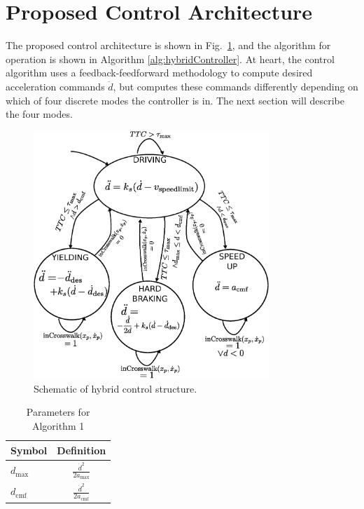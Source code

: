 \documentclass[letterpaper, 10 pt, conference]{ieeeconf}  %
\begin{document}
\section{Proposed Control Architecture}

The proposed control architecture is shown in Fig.~\ref{fig:hybridController}, and the algorithm for operation is shown in Algorithm \ref{alg:hybridController}. At heart, the control algorithm uses a feedback-feedforward methodology to compute desired acceleration commands $\ddot{d}$, but computes these commands differently depending on which of four discrete modes the controller is in. The next section will describe the four modes. 

\begin{figure}
\centering
\includegraphics[width=3.5in]{figures/stateDiagram2.eps}
\caption{Schematic of hybrid control structure.}
\label{fig:hybridController}
\end{figure}

\begin{table}[h]
\begin{center}
\caption{Parameters for Algorithm 1}\label{tb:params}
\begin{tabular}{lc}
Symbol & Definition \\\hline\hline
$d_\mathrm{max}$ & $\frac{\dot{d}^2}{2a_\mathrm{max}}$ \\
$d_\mathrm{cmf}$ & $\frac{\dot{d}^2}{2a_\mathrm{cmf}}$ \\\hline
\end{tabular}
\end{center}
\end{table}
\end{document}
